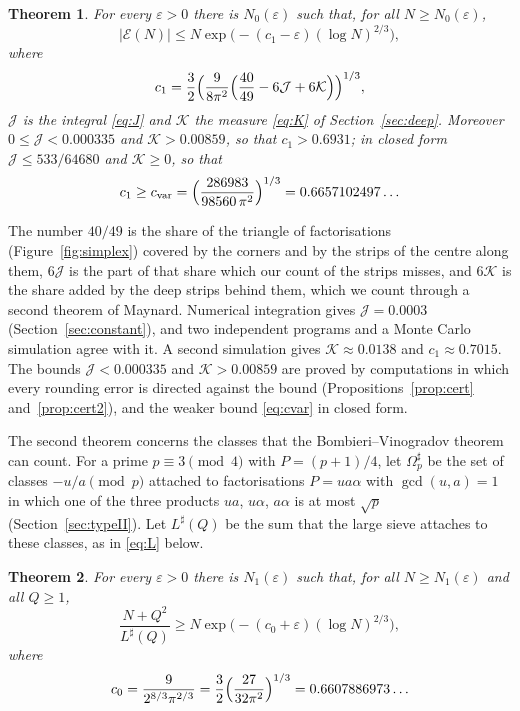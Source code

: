 \documentclass[aps,prd,twocolumn,superscriptaddress,nofootinbib,longbibliography,floatfix,showkeys,nobalancelastpage,amsmath,amssymb,10pt]{revtex4-2}
\theoremstyle{plain}
\theoremstyle{definition}
\theoremstyle{plain}
\newtheorem{mainthm}{Theorem}
\newcommand{\eps}{\varepsilon}
\newcommand{\Ex}{\mathcal{E}}
\newcommand{\Jc}{\mathcal{J}}
\newcommand{\Kc}{\mathcal{K}}
\newcommand{\Kbound}{0.00859}
\newcommand{\cbound}{0.6931}
\newcommand{\Kmc}{0.0138}
\newcommand{\cmc}{0.7015}
\begin{document}
\begin{mainthm}\label{thm:A}
For every $\eps>0$ there is $N_0(\eps)$ such that, for all $N\ge N_0(\eps)$,
\begin{equation}\label{eq:main}
|\Ex(N)|\le N\exp\bigl(-(c_1-\eps)(\log N)^{2/3}\bigr),
\end{equation}
where
\begin{equation}\label{eq:c1}
c_1=\frac32\Bigl(\frac{9}{8\pi^2}\Bigl(\frac{40}{49}-6\Jc+6\Kc\Bigr)\Bigr)^{1/3},
\end{equation}
$\Jc$ is the integral \eqref{eq:J} and $\Kc$ the measure \eqref{eq:K} of Section~\ref{sec:deep}. Moreover $0\le\Jc<0.000335$ and $\Kc>\Kbound$, so that $c_1>\cbound$; in closed form $\Jc\le533/64680$ and $\Kc\ge0$, so that
\begin{equation}\label{eq:cvar}
c_1\ge c_{\mathrm{var}}=\Bigl(\frac{286983}{98560\,\pi^2}\Bigr)^{1/3}=0.6657102497\ldots
\end{equation}
\end{mainthm}

The number $40/49$ is the share of the triangle of factorisations (Figure~\ref{fig:simplex}) covered by the corners and by the strips of the centre along them, $6\Jc$ is the part of that share which our count of the strips misses, and $6\Kc$ is the share added by the deep strips behind them, which we count through a second theorem of Maynard. Numerical integration gives $\Jc=0.0003$ (Section~\ref{sec:constant}), and two independent programs and a Monte Carlo simulation agree with it. A second simulation gives $\Kc\approx\Kmc$ and $c_1\approx\cmc$. The bounds $\Jc<0.000335$ and $\Kc>\Kbound$ are proved by computations in which every rounding error is directed against the bound (Propositions~\ref{prop:cert} and~\ref{prop:cert2}), and the weaker bound \eqref{eq:cvar} in closed form.

The second theorem concerns the classes that the Bombieri--Vinogradov theorem can count. For a prime $p\equiv3\pmod4$ with $P=(p+1)/4$, let $\Omega^\sharp_p$ be the set of classes $-u/a\pmod p$ attached to factorisations $P=ua\alpha$ with $\gcd(u,a)=1$ in which one of the three products $ua$, $u\alpha$, $a\alpha$ is at most $\sqrt p$ (Section~\ref{sec:typeII}). Let $L^\sharp(Q)$ be the sum that the large sieve attaches to these classes, as in \eqref{eq:L} below.

\begin{mainthm}\label{thm:B}
For every $\eps>0$ there is $N_1(\eps)$ such that, for all $N\ge N_1(\eps)$ and all $Q\ge1$,
\[
\frac{N+Q^2}{L^\sharp(Q)}\ge N\exp\bigl(-(c_0+\eps)(\log N)^{2/3}\bigr),
\]
where
\begin{equation}\label{eq:c0}
c_0=\frac{9}{2^{8/3}\pi^{2/3}}=\frac32\Bigl(\frac{27}{32\pi^2}\Bigr)^{1/3}=0.6607886973\ldots
\end{equation}
\end{mainthm}
\end{document}
